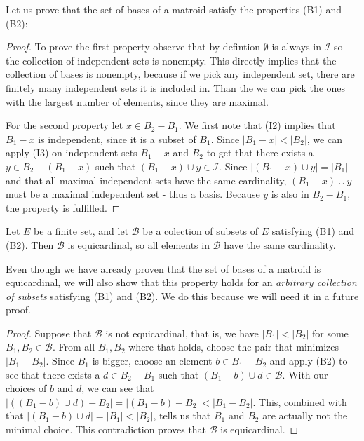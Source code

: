 Let us prove that the set of bases of a matroid satisfy the properties (B1) and (B2):
\begin{proof}
    To prove the first property observe that by defintion $\emptyset$ is always in $\mathcal{I}$ so the collection of independent sets is nonempty. This directly implies that the collection of bases is nonempty, because if we pick any independent set, there are finitely many independent sets it is included in. Than the we can pick the ones with the largest number of elements, since they are maximal. %
    
    
    For the second property let $x\in B_2 - B_1$. We first note that (I2) implies that $B_1 - x$ is independent, since it is a subset of $B_1$. Since $|B_1-x|<|B_2|$, we can apply (I3) on independent sets $B_1-x$ and $B_2$ to get that there exists a $y\in B_2-(B_1-x)$ such that $(B_1-x)\cup y \in\mathcal{I}$. Since $|(B_1-x)\cup y|=|B_1|$ and that all maximal independent sets have the same cardinality, $(B_1-x)\cup y$ must be a maximal independent set - thus a basis. Because $y$ is also in $B_2-B_1$, the property is fulfilled.
\end{proof} 



\begin{lemma}\label{samesize}
    Let $E$ be a finite set, and let $\mathcal{B}$ be a colection of subsets of $E$ satisfying (B1) and (B2). Then $\mathcal{B}$ is equicardinal, so all elements in $\mathcal{B}$ have the same cardinality.
\end{lemma}

Even though we have already proven that the set of bases of a matroid is equicardinal, we will also show that this property holds for an \textit{arbitrary collection of subsets} satisfying (B1) and (B2). We do this because we will need it in a future proof.


\begin{proof}
    Suppose that $\mathcal{B}$ is not equicardinal, that is, we have $|B_1|<|B_2|$ for some $B_1,B_2\in\mathcal{B}$. From all $B_1,B_2$ where that holds, choose the pair that minimizes $|B_1-B_2|$. Since $B_1$ is bigger, choose an element $b\in B_1-B_2$ and apply (B2) to see that there exists a $d\in B_2-B_1$ such that $(B_1-b)\cup d \in\mathcal{B}$. With our choices of $b$ and $d$, we can see that $|((B_1-b)\cup d)-B_2|=|(B_1-b)-B_2|<|B_1-B_2|$. This, combined with that $|(B_1-b)\cup d|=|B_1|<|B_2|$, tells us that $B_1$ and $B_2$ are actually not the minimal choice. This contradiction proves that $\mathcal{B}$ is equicardinal.
\end{proof}

